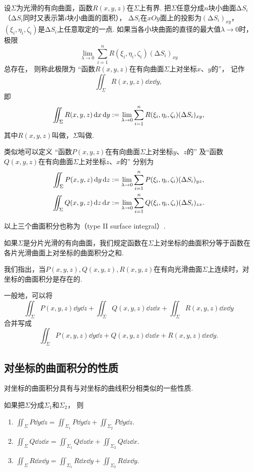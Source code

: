 设\(\Sigma\)为光滑的有向曲面，函数\(R(x,y,z)\)在\(\Sigma\)上有界.
把\(\Sigma\)任意分成\(n\)块小曲面\(\increment S_i\)%
（\(\increment S_i\)同时又表示第\(i\)块小曲面的面积），
\(\increment S_i\)在\(xOy\)面上的投影为\((\increment S_i)_{xy}\)，
\((\xi_i,\eta_i,\zeta_i)\)是\(\increment S_i\)上任意取定的一点.
如果当各小块曲面的直径的最大值\(\lambda\to0\)时，极限\[
	\lim_{\lambda\to0}
	\sum_{i=1}^n
	R(\xi_i,\eta_i,\zeta_i)
	(\increment S_i)_{xy}
\]总存在，
则称此极限为
“函数\(R(x,y,z)\)在有向曲面\(\Sigma\)上对坐标\(x\)、\(y\)的”，
记作\[
	\iint_\Sigma R(x,y,z) \dd{x}\dd{y},
\]
即\[
	\iint_\Sigma R(x,y,z) \dd{x}\dd{y}
	:=
	\lim_{\lambda\to0}
	\sum_{i=1}^n
	R(\xi_i,\eta_i,\zeta_i)
	(\Delta S_i)_{xy},
\]
其中\(R(x,y,z)\)叫做，\(\Sigma\)叫做.

类似地可以定义
“函数\(P(x,y,z)\)在有向曲面\(\Sigma\)上对坐标\(y\)、\(z\)的”
及“函数\(Q(x,y,z)\)在有向曲面\(\Sigma\)上对坐标\(z\)、\(x\)的”
分别为\begin{gather*}
	\iint_\Sigma P(x,y,z) \dd{y}\dd{z}
	:=
	\lim_{\lambda\to0}
	\sum_{i=1}^n P(\xi_i,\eta_i,\zeta_i) (\Delta S_i)_{yz}, \\
	\iint_\Sigma Q(x,y,z) \dd{z}\dd{x}
	:=
	\lim_{\lambda\to0}
	\sum_{i=1}^n Q(\xi_i,\eta_i,\zeta_i) (\Delta S_i)_{zx}.
\end{gather*}

以上三个曲面积分也称为（type II surface integral）.

如果\(\Sigma\)是分片光滑的有向曲面，我们规定函数在\(\Sigma\)上对坐标的曲面积分等于函数在各片光滑曲面上对坐标的曲面积分之和.

我们指出，当\(P(x,y,z),Q(x,y,z),R(x,y,z)\)在有向光滑曲面\(\Sigma\)上连续时，对坐标的曲面积分是存在的.

一般地，可以将\[
\iint_\Sigma P(x,y,z) \dd{y}\dd{z}
+\iint_\Sigma Q(x,y,z) \dd{z}\dd{x}
+\iint_\Sigma R(x,y,z) \dd{x}\dd{y}
\]合并写成\[
\iint_\Sigma{P(x,y,z)\dd{y}\dd{z}+Q(x,y,z)\dd{z}\dd{x}+R(x,y,z)\dd{x}\dd{y}}.
\]

\subsection{对坐标的曲面积分的性质}
对坐标的曲面积分具有与对坐标的曲线积分相类似的一些性质.
\begin{property}
如果把\(\Sigma\)分成\(\Sigma_1\)和\(\Sigma_2\)，
则\begin{enumerate}
	\item \(\iint_\Sigma P\dd{y}\dd{z}
	=\iint_{\Sigma_1} P\dd{y}\dd{z}
	+\iint_{\Sigma_2} P\dd{y}\dd{z}\).

	\item \(\iint_\Sigma Q\dd{z}\dd{x}
	=\iint_{\Sigma_1} Q\dd{z}\dd{x}
	+\iint_{\Sigma_2} Q\dd{z}\dd{x}\).

	\item \(\iint_\Sigma R\dd{x}\dd{y}
	=\iint_{\Sigma_1} R\dd{x}\dd{y}
	+\iint_{\Sigma_2} R\dd{x}\dd{y}\).
\end{enumerate}
\end{property}

